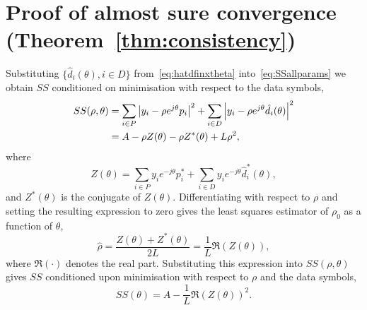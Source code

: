 \documentclass[journal]{IEEEtran}
\begin{document}



\section{Proof of almost sure convergence (Theorem~\ref{thm:consistency}) } \label{sec:proof-almost-sure}

Substituting $\{ \hat{d}_i(\theta), i \in D \}$ from~\eqref{eq:hatdfinxtheta} into~\eqref{eq:SSallparams} we obtain $SS$ conditioned on minimisation with respect to the data symbols,
 \begin{align*}
SS(\rho, \theta) &=\sum_{i \in P} {\left\vert  y_i - \rho e^{j\theta} p_i  \right\vert}^2 + \sum_{i \in D} {\left\vert  y_i - \rho e^{j\theta} \hat{d_i}(\theta)  \right\vert}^2 \\
&= A - \rho Z(\theta) - \rho Z^*(\theta) + L \rho^2,
\end{align*}
where
\[
Z(\theta)  = \sum_{i \in P} y_i e^{-j\theta} p_i^* + \sum_{i \in D} y_i e^{-j\theta} \hat{d}_i^*(\theta),
\]
and $Z^*(\theta)$ is the conjugate of $Z(\theta)$.  Differentiating with respect to $\rho$ and setting the resulting expression to zero gives the least squares estimator of $\rho_0$ as a function of $\theta$, 
\begin{equation}\label{eq:hatrhoZ}
\hat{\rho} = \frac{Z(\theta) + Z^*(\theta)}{2L} = \frac{1}{L}\Re(Z(\theta)),
\end{equation}
where $\Re(\cdot)$ denotes the real part.  Substituting this expression into $SS(\rho, \theta)$ gives $SS$ conditioned upon minimisation with respect to $\rho$ and the data symbols,
\[
SS(\theta) = A - \frac{1}{L}\Re(Z(\theta))^2.
\]
\end{document}

